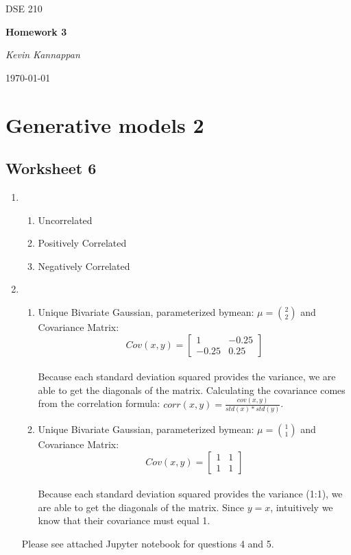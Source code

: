 \documentclass[12pt]{article}
\theoremstyle{plain}
\theoremstyle{definition}
\numberwithin{equation}{theorem}
\begin{document}
\begin{titlepage}
	\centering
	\vspace{4cm}
	{\scshape\Large DSE 210\par}
	\vspace{1.5cm}
	{\huge\bfseries Homework 3\par}
	\vspace{2cm}
	{\Large\itshape Kevin Kannappan\par}

	{\large \today\par}
\end{titlepage}


\section{Generative models 2}
\subsection{Worksheet 6}
\begin{enumerate}
\item
	\begin{enumerate}
	\item Uncorrelated
	\item Positively Correlated
	\item Negatively Correlated
	\end{enumerate}
\addtocounter{enumi}{1}
\item
	\begin{enumerate}
	\item Unique Bivariate Gaussian, parameterized bymean: $\mu = \binom{2}{2}$ and Covariance Matrix:
	\[
Cov(x,y)=
  \begin{bmatrix}
    1 & -0.25 \\
    -0.25 & 0.25
  \end{bmatrix}
\]\\
	Because each standard deviation squared provides the variance, we are able to get the diagonals of the matrix. Calculating the covariance comes from the correlation formula: $corr(x,y) = \frac{cov(x,y)}{std(x)*std(y)}$.
	\item Unique Bivariate Gaussian, parameterized bymean: $\mu = \binom{1}{1}$ and Covariance Matrix:
	\[
Cov(x,y)=
  \begin{bmatrix}
    1 & 1 \\
    1 & 1
  \end{bmatrix}
\]\\
	Because each standard deviation squared provides the variance (1:1), we are able to get the diagonals of the matrix. Since $y=x$, intuitively we know that their covariance must equal 1.
	\end{enumerate}
\bigskip
Please see attached Jupyter notebook for questions 4 and 5.
\end{enumerate}
\bigskip
\end{document}
